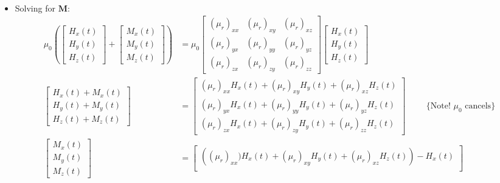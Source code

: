 \begin{itemize}
\begin{align*}
    \end{align*}
  \item Solving for \( \mathbf{M} \):
    \begin{align*}
      \mu_0 \left(
      \begin{bmatrix}
        H_x(t) \\
        H_y(t) \\
        H_z(t)
      \end{bmatrix} +
      \begin{bmatrix}
        M_x(t) \\
        M_y(t) \\
        M_z(t)
      \end{bmatrix} \right)
      &= \mu_0
      \begin{bmatrix}
        (\mu_r)_{xx} & (\mu_r)_{xy} & (\mu_r)_{xz} \\
        (\mu_r)_{yx} & (\mu_r)_{yy} & (\mu_r)_{yz} \\
        (\mu_r)_{zx} & (\mu_r)_{zy} & (\mu_r)_{zz}
      \end{bmatrix}
      \begin{bmatrix}
        H_x(t) \\
        H_y(t) \\
        H_z(t)
      \end{bmatrix} \\
      \begin{bmatrix}
        H_x(t) + M_x(t) \\
        H_y(t) + M_y(t) \\
        H_z(t) + M_z(t)
      \end{bmatrix}
      &=
      \begin{bmatrix}
        (\mu_r)_{xx} H_x(t) + (\mu_r)_{xy} H_y(t) + (\mu_r)_{xz} H_z(t) \\
        (\mu_r)_{yx} H_x(t) + (\mu_r)_{yy} H_y(t) + (\mu_r)_{yz} H_z(t) \\
        (\mu_r)_{zx} H_x(t) + (\mu_r)_{zy} H_y(t) + (\mu_r)_{zz} H_z(t)
      \end{bmatrix} \hspace{1cm} \text{\{Note! \(\mu_0\) cancels\}} \\
      \begin{bmatrix}
        M_x(t) \\
        M_y(t) \\
        M_z(t)
      \end{bmatrix}
      &=
      \begin{bmatrix}
          \left((\mu_r)_{xx})H_x(t) + (\mu_r)_{xy}H_y(t) + (\mu_r)_{xz}H_z(t)\right) - H_x(t) \\

\end{bmatrix}
\end{align*}
\end{itemize}
